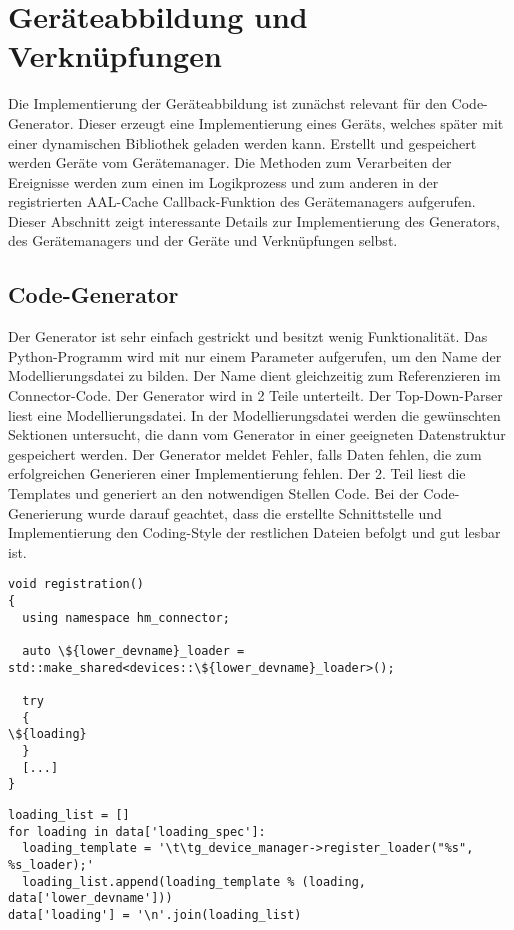 \section{Geräteabbildung und Verknüpfungen}
\label{imp_abb}

Die Implementierung der Geräteabbildung ist zunächst relevant für den Code-Generator.
Dieser erzeugt eine Implementierung eines Geräts, welches später mit einer dynamischen Bibliothek geladen werden kann.
Erstellt und gespeichert werden Geräte vom Gerätemanager.
Die Methoden zum Verarbeiten der Ereignisse werden zum einen im Logikprozess und zum anderen in der registrierten
AAL-Cache Callback-Funktion des Gerätemanagers aufgerufen.
Dieser Abschnitt zeigt interessante Details zur Implementierung des Generators, des Gerätemanagers und der Geräte und
Verknüpfungen selbst.

\subsection{Code-Generator}
\label{imp_abb_gen}

Der Generator ist sehr einfach gestrickt und besitzt wenig Funktionalität.
Das Python-Programm wird mit nur einem Parameter aufgerufen, um den Name der Modellierungsdatei
zu bilden.
Der Name dient gleichzeitig zum Referenzieren im Connector-Code.
Der Generator wird in 2 Teile unterteilt.
Der Top-Down-Parser liest eine Modellierungsdatei.
In der Modellierungsdatei werden die gewünschten Sektionen untersucht, die dann
vom Generator in einer geeigneten Datenstruktur gespeichert werden.
Der Generator meldet Fehler, falls Daten fehlen, die zum erfolgreichen
Generieren einer Implementierung fehlen.
Der 2. Teil liest die Templates und generiert an den notwendigen Stellen Code.
Bei der Code-Generierung wurde darauf geachtet, dass die erstellte Schnittstelle
und Implementierung den Coding-Style der restlichen Dateien befolgt und gut lesbar ist.

\begin{lstlisting}[frame=single,caption={Ausschnitt des Templates für die Geräte-Implementierung},label=gen_temp]
void registration()
{
  using namespace hm_connector;

  auto \${lower_devname}_loader = std::make_shared<devices::\${lower_devname}_loader>();

  try
  {
\${loading}
  }
  [...]
}
\end{lstlisting}

\lstset{language=Python}
\begin{lstlisting}[frame=single,caption={Beispiel für die Code-Generierung des Generators},label=gen_code]
loading_list = []
for loading in data['loading_spec']:
  loading_template = '\t\tg_device_manager->register_loader("%s", %s_loader);'
  loading_list.append(loading_template % (loading, data['lower_devname']))
data['loading'] = '\n'.join(loading_list)
\end{lstlisting}

